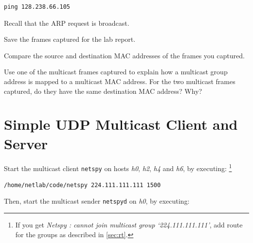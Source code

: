 \documentclass{../UTNetLab}
\begin{document}
\begin{lstlisting}
ping 128.238.66.105
    \end{lstlisting}
Recall that the ARP request is broadcast.%

Save the frames captured for the lab report.

\begin{report}
    \item Compare the source and destination MAC addresses of the frames you captured.

    \item Use one of the multicast frames captured to explain how a multicast group address is mapped to a multicast MAC address.
    For the two multicast frames captured, do they have the same destination MAC address?
    Why?
\end{report}

\section{Simple UDP Multicast Client and Server}




Start the multicast client \lstinline{netspy} on hosts \textit{h0}, \textit{h2}, \textit{h4} and \textit{h6}, by executing:%
\footnote{If you get \textit{Netspy : cannot join multicast group `224.111.111.111'}, add route for the groups as described in \autoref{sec:rt}.}

\begin{lstlisting}
/home/netlab/code/netspy 224.111.111.111 1500
    \end{lstlisting}

Then, start the multicast sender \lstinline{netspyd} on \textit{h0}, by executing:
\end{document}

